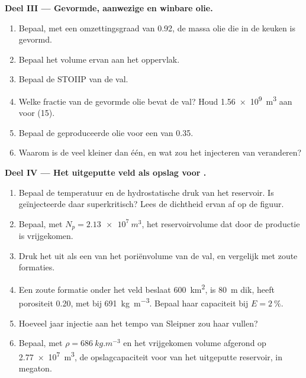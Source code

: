 \begin{problem}
\noindent\textbf{Deel III --- Gevormde, aanwezige en winbare olie.}
\begin{enumerate}[resume]
  \item Bepaal, met een omzettingsgraad van 0.92, de massa olie die in de keuken is gevormd.
  \item Bepaal het volume ervan aan het oppervlak.
  \item Bepaal de STOIIP van de val.
  \item Welke fractie van de gevormde olie bevat de val? Houd \qty{1.56e9}{m^3} aan voor (15).
  \item Bepaal de geproduceerde olie voor een  van 0.35.
  \item Waarom is de  veel kleiner dan één, en wat zou het injecteren van  veranderen?
\end{enumerate}

\noindent\textbf{Deel IV --- Het uitgeputte veld als opslag voor .}
\begin{enumerate}[resume]
  \item Bepaal de temperatuur en de hydrostatische druk van het reservoir. Is geïnjecteerde 
        daar superkritisch? Lees de dichtheid ervan af op de figuur.
  \item Bepaal, met $N_p = \qty{2.13e7}{m^3}$, het reservoirvolume dat door de productie is vrijgekomen.
  \item Druk het uit als een  van het poriënvolume van de val, en vergelijk met
        zoute formaties.
  \item Een zoute formatie onder het veld beslaat \qty{600}{km^2}, is \qty{80}{m} dik, heeft
        porositeit 0.20, met  bij \qty{691}{kg.m^{-3}}. Bepaal haar capaciteit bij $E =
        \qty{2}{\percent}$.
  \item Hoeveel jaar injectie aan het tempo van Sleipner zou haar vullen?
  \item Bepaal, met $\rho = \qty{686}{kg.m^{-3}}$ en het vrijgekomen volume afgerond op \qty{2.77e7}{m^3},
        de opslagcapaciteit voor  van het uitgeputte reservoir, in megaton.
\end{enumerate}
\end{problem}
